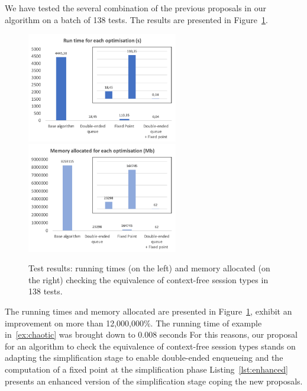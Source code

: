 We have tested the several combination of the previous proposals
in our algorithm on a batch of 138 tests. The results are presented 
in Figure~\ref{fig:results}.

\begin{figure}[h]
	\includegraphics[height=4.8cm]{img/run_time}	\qquad 
	\includegraphics[height=4.8cm]{img/memory_alloc}	
	\caption{Test results: running times (on the left) and
	memory allocated (on the right) checking the equivalence 
	of context-free session types in 138 tests.}
	\label{fig:results}
\end{figure}

The running times and memory allocated are presented in
Figure~\ref{fig:results}, exhibit an improvement on more than
12,000,000\%. The running time of example in~\eqref{ex:chaotic} was
brought down to 0.008 seconds  For this reasons, our
proposal for an algorithm to check the equivalence of context-free
session types stands on adapting the simplification stage to enable
double-ended enqueueing and the computation of a fixed point at the
simplification phase Listing~\ref{lst:enhanced} presents an enhanced
version of the simplification stage coping the new proposals.



